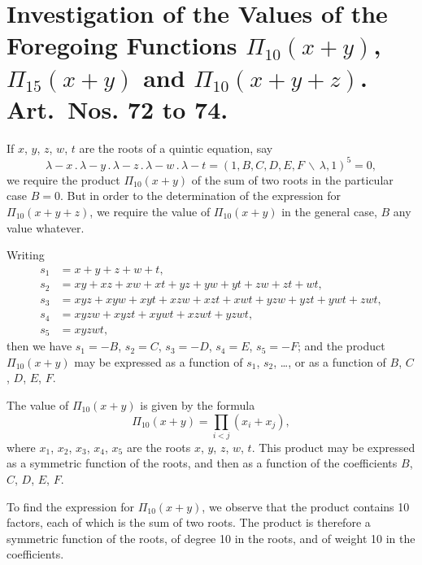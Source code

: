 \documentclass[11pt,a4paper]{book}
\begin{document}
{{{\section*{Investigation of the Values of the Foregoing Functions $\Pi_{10}(x + y)$, $\Pi_{15}(x + y)$ and $\Pi_{10}(x + y + z)$. Art.~Nos. \textbf{72} to \textbf{74}.}

\setcounter{art}{71}
\begin{art}
If $x$, $y$, $z$, $w$, $t$ are the roots of a quintic equation, say
\[
\lambda - x\,.\,\lambda - y\,.\,\lambda - z\,.\,\lambda - w\,.\,\lambda - t = (1, B, C, D, E, F\,\backslash\,\lambda, 1)^{5} = 0,
\]
we require the product $\Pi_{10}(x + y)$ of the sum of two roots in the particular case $B = 0$. But in order to the determination of the expression for $\Pi_{10}(x + y + z)$, we require the value of $\Pi_{10}(x + y)$ in the general case, $B$ any value whatever.
\end{art}

\setcounter{art}{72}
\begin{art}
Writing
\begin{align*}
s_{1} &= x + y + z + w + t, \\
s_{2} &= xy + xz + xw + xt + yz + yw + yt + zw + zt + wt, \\
s_{3} &= xyz + xyw + xyt + xzw + xzt + xwt + yzw + yzt + ywt + zwt, \\
s_{4} &= xyzw + xyzt + xywt + xzwt + yzwt, \\
s_{5} &= xyzwt,
\end{align*}
then we have $s_{1} = -B$, $s_{2} = C$, $s_{3} = -D$, $s_{4} = E$, $s_{5} = -F$; and the product $\Pi_{10}(x + y)$ may be expressed as a function of $s_{1}$, $s_{2}$, \ldots, or as a function of $B$, $C$, $D$, $E$, $F$.
\end{art}

\setcounter{art}{73}
\begin{art}
The value of $\Pi_{10}(x + y)$ is given by the formula
\[
\Pi_{10}(x + y) = \prod_{i < j} (x_{i} + x_{j}),
\]
where $x_{1}$, $x_{2}$, $x_{3}$, $x_{4}$, $x_{5}$ are the roots $x$, $y$, $z$, $w$, $t$. This product may be expressed as a symmetric function of the roots, and then as a function of the coefficients $B$, $C$, $D$, $E$, $F$.

To find the expression for $\Pi_{10}(x + y)$, we observe that the product contains 10 factors, each of which is the sum of two roots. The product is therefore a symmetric function of the roots, of degree 10 in the roots, and of weight 10 in the coefficients.
\end{art}

}}}
\end{document}
